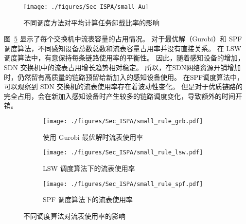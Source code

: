 \vspace{-0.5em}
\begin{figure}[!h]
  \centering
  \texttt{[image: ./figures/Sec\_ISPA/small\_Au]}
  \vspace{-0.5em}
  \caption{不同调度方法对平均计算任务卸载比率的影响}
  \vspace{-0.5em}
  \label{fig_smallAu}
\end{figure}
\vspace{-0.5em}

图~\ref{fig_smallrule} 显示了每个交换机中流表容量的占用情况。
对于最优解（Gurobi）和 SPF 调度算法，不同感知设备总数总数和流表容量占用率并没有直接关系。
在 LSW 调度算法中，有意保持每条链路使用率的平衡性。
因此，随着感知设备的增加，SDN 交换机中的流表占用增长趋势相对稳定。
所以，在SDN网络资源开销增加时，仍然留有高质量的链路预留给新加入的感知设备使用。
在SPF调度算法中，可以观察到 SDN 交换机的流表使用率存在着波动性变化。
但是对于优质链路的完全占用，会在新加入感知设备时产生较多的链路调度变化，导致额外的时间开销。

\begin{figure}[!h]
  \centering
  \begin{subfigure}[h]{0.99\linewidth}
    \centering
    \texttt{[image: ./figures/Sec\_ISPA/small\_rule\_grb.pdf]}
    \label{fig_smallNetworkRG}
    \vspace{-0.5em}
    \caption{使用 Gurobi 最优解时流表使用率}
  \end{subfigure}
  \begin{subfigure}[h]{0.99\linewidth}
    \centering
    \texttt{[image: ./figures/Sec\_ISPA/small\_rule\_lsw.pdf]}
    \label{fig_smallNetworkRL}
    \vspace{-0.5em}
    \caption{LSW 调度算法下的流表使用率}
  \end{subfigure}
  \begin{subfigure}[h]{0.99\linewidth}
    \centering
    \texttt{[image: ./figures/Sec\_ISPA/small\_rule\_spf.pdf]}
    \label{fig_smallNetworkRS}
    \vspace{-0.5em}
    \caption{SPF 调度算法下的流表使用率}
  \end{subfigure}
  \vspace{-0.5em}
  \caption{不同调度算法对流表使用率的影响}
\label{fig_smallrule}
\end{figure}




